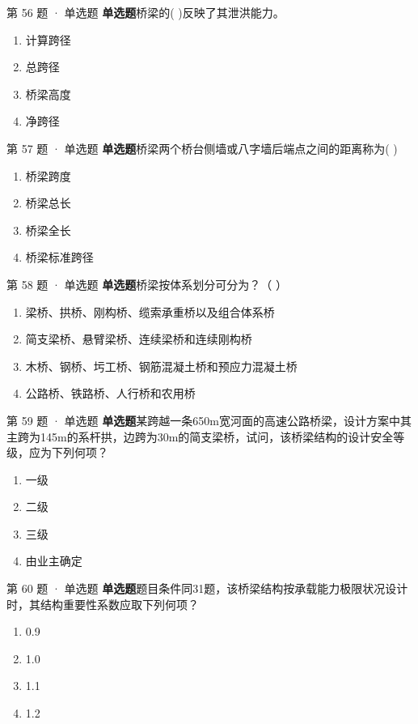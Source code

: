 \documentclass[UTF8,zihao=-4,openany]{ctexbook}
\newenvironment{choices}{\begin{enumerate}[label=\Alph*.,leftmargin=9mm,labelsep=3mm,itemsep=2pt,topsep=4pt]}{\end{enumerate}}
\newcommand{\qtype}[1]{\textcolor{brand}{\sffamily\bfseries #1}}
\begin{document}
\begin{questionbox}{第 56 题 · 单选题}
\qtype{单选题}\quad 桥梁的( )反映了其泄洪能力。
\begin{choices}
\item 计算跨径
\item 总跨径
\item 桥梁高度
\item 净跨径
\end{choices}
\end{questionbox}

\begin{questionbox}{第 57 题 · 单选题}
\qtype{单选题}\quad 桥梁两个桥台侧墙或八字墙后端点之间的距离称为( )
\begin{choices}
\item 桥梁跨度
\item 桥梁总长
\item 桥梁全长
\item 桥梁标准跨径
\end{choices}
\end{questionbox}

\begin{questionbox}{第 58 题 · 单选题}
\qtype{单选题}\quad 桥梁按体系划分可分为？（ ）
\begin{choices}
\item 梁桥、拱桥、刚构桥、缆索承重桥以及组合体系桥
\item 简支梁桥、悬臂梁桥、连续梁桥和连续刚构桥
\item 木桥、钢桥、圬工桥、钢筋混凝土桥和预应力混凝土桥
\item 公路桥、铁路桥、人行桥和农用桥
\end{choices}
\end{questionbox}

\begin{questionbox}{第 59 题 · 单选题}
\qtype{单选题}\quad 某跨越一条650m宽河面的高速公路桥梁，设计方案中其主跨为145m的系杆拱，边跨为30m的简支梁桥，试问，该桥梁结构的设计安全等级，应为下列何项？
\begin{choices}
\item 一级
\item 二级
\item 三级
\item 由业主确定
\end{choices}
\end{questionbox}

\begin{questionbox}{第 60 题 · 单选题}
\qtype{单选题}\quad 题目条件同31题，该桥梁结构按承载能力极限状况设计时，其结构重要性系数应取下列何项？
\begin{choices}
\item 0.9
\item 1.0
\item 1.1
\item 1.2
\end{choices}
\end{questionbox}
\end{document}
